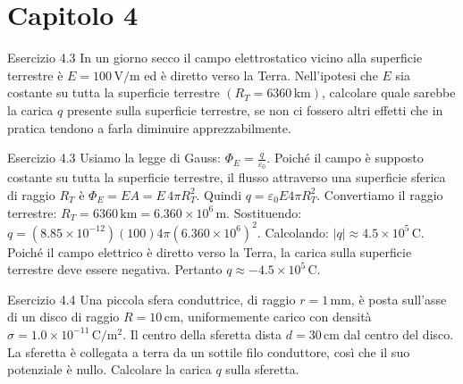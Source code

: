 \documentclass[a4paper]{article}
\begin{document}
\section{Capitolo 4}
\begin{snippetexercise}{Esercizio 4.3}
    In un giorno secco il campo elettrostatico vicino alla superficie terrestre
    è \(E = 100\,\mathrm{V/m}\) ed è diretto verso la Terra.
    Nell'ipotesi che \(E\) sia costante su tutta la superficie terrestre
    \((R_T = 6360\,\mathrm{km})\), calcolare quale sarebbe la carica \(q\)
    presente sulla superficie terrestre, se non ci fossero altri effetti che in
    pratica tendono a farla diminuire apprezzabilmente.
\end{snippetexercise}
\begin{snippetsolution}{Esercizio 4.3}
    Usiamo la legge di Gauss:
    \(\Phi_E = \frac{q}{\varepsilon_0}.\)
    Poiché il campo è supposto costante su tutta la superficie terrestre,
    il flusso attraverso una superficie sferica di raggio \(R_T\) è
    \(\Phi_E = EA = E \, 4\pi R_T^2.\)
    Quindi
    \(q = \varepsilon_0 E 4\pi R_T^2.\)
    Convertiamo il raggio terrestre:
    \(R_T = 6360\,\mathrm{km} = 6.360 \times 10^6\,\mathrm{m}.\)
    Sostituendo:
    \(q = \left(8.85 \times 10^{-12}\right) (100) 4\pi \left(6.360 \times 10^6\right)^2.\)
    Calcolando:
    \(|q| \approx 4.5 \times 10^5\,\mathrm{C}.\)
    Poiché il campo elettrico è diretto verso la Terra, la carica sulla
    superficie terrestre deve essere negativa. Pertanto
    \(\boxed{q \approx -4.5 \times 10^5\,\mathrm{C}}.\)
\end{snippetsolution}
\begin{snippetexercise}{Esercizio 4.4}
    Una piccola sfera conduttrice, di raggio \(r = 1\,\mathrm{mm}\), è posta
    sull'asse di un disco di raggio \(R = 10\,\mathrm{cm}\), uniformemente
    carico con densità
    \(\sigma = 1.0 \times 10^{-11}\,\mathrm{C/m^2}\).
    Il centro della sferetta dista \(d = 30\,\mathrm{cm}\) dal centro del disco.
    La sferetta è collegata a terra da un sottile filo conduttore, così che il
    suo potenziale è nullo. Calcolare la carica \(q\) sulla sferetta.
\end{snippetexercise}
\end{document}
